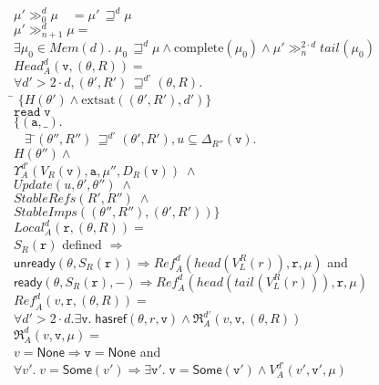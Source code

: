 \documentclass[preprint]{sigplanconf}
\newcommand{\betterstate}[3]{{#2}\, {\sqsupseteq}^{#1} {#3}}
\newcommand{\futurestate}[4]{{#3} \gg^{#1}_{#2} {#4}}
\newcommand{\ready}[3]{\mathsf{ready}({#1}, {#2}, {#3})}
\newcommand{\unready}[2]{\mathsf{unready}({#1}, {#2})}
\newcommand{\hasref}[3]{\mathsf{hasref}({#1}, {#2}, {#3})}
\renewcommand{\implies}{\Rightarrow}
\newcommand{\term}[1]{\ensuremath{\mathtt{{#1}}}}
\newcommand{\Head}{\mathit{Head}}
\newcommand{\Local}{\mathit{Local}}
\newcommand{\Ref}{\mathit{Ref}}
\newcommand{\Mem}[1]{\mathit{Mem}(#1)}
\newcommand{\Update}{\mathit{Update}}
\newcommand{\StableRef}{\mathit{StableRefs}}
\newcommand{\StableImp}{\mathit{StableImps}}
\newcommand{\None}{\mathsf{None}}
\newcommand{\Some}[1]{\mathsf{Some}({#1})}
\newcommand{\head}[1]{\mathit{head}(#1)}
\newcommand{\tail}[2][]{\mathit{tail}^{#1}(#2)}
\newcommand{\satisfyext}[2]{\mathrm{extsat}({#1}, {#2})}
\newcommand{\complete}[1]{\mathrm{complete}(#1)}
\begin{document}
\begin{figure}
\begin{tabbing}
$\futurestate{d}{0}{\mu'}{\mu} \;\;\;\,= \betterstate{d}{\mu'}{\mu}$ \\
$\futurestate{d}{n+1}{\mu'}{\mu} = $ \\
\> $\exists \mu_0 \in \Mem{d}.\; \betterstate{d}{\mu_0}{\mu} \land \complete{\mu_0} \land \futurestate{2\cdot d}{n}{\mu'}{\tail{\mu_0}}$ 
\\[1em]

$\Head^d_A(\term{v}, (\theta,R)) = $\\
\> $\forall d' > 2\cdot d, \betterstate{d'}{(\theta',R')}{(\theta,R)}.\;$ \\
\> \;\;\= $\{H(\theta') \land \satisfyext{(\theta',R')}{d'}\} $\\
\> \> \term{read\;v} \\
\> \> $\{(\term{a},\_).\;$\\ 
\> \> $\;\;\;\exists$ \=$\betterstate{d'}{(\theta'', R'')}{(\theta',R')}, u \subseteq \Delta_{R''}(\term{v}).$\\
\> \> \> $H(\theta'') \land$ \\
\> \> \> $\Upsilon^{d'}_A(V_R(\term{v}), \term{a}, \mu'', D_{R}(\term{v})) \;\land$ \\
\> \> \> $\Update(u, \theta', \theta'') \;\land$ \\ 
\> \> \> $\StableRef(R', R'') \;\land$ \\
\> \> \> $\StableImp((\theta'',R''), (\theta',R'))\} $
\\[1em]

$\Local^d_A(\term{r}, (\theta, R)) = $ \\
\> $S_R(\term{r})$ defined $\implies$ \\
\> \> $\unready{\theta}{S_R(\term{r})} \implies \Ref^d_A(\head{V^R_L(r)}, \term{r}, \mu)$ and \\
\> \> $\ready{\theta}{S_R(\term{r})}{-} \implies \Ref^d_A(\head{\tail{V^R_L(r)}}, \term{r}, \mu)$ \\[1em]

$\Ref^d_A(v, \term{r}, (\theta,R)) = $ \\
\> $\forall d' > 2\cdot d. \exists \term{v}.\;\hasref{\theta}{r}{\term{v}} \land \Re^{d'}_A(v, \term{v}, (\theta,R))$ 
\\[1em]

$\Re^d_A(v, \term{v}, \mu) = $ \\
\> \> $v = \None \implies \term{v} = \None$ and \\
\> \> $\forall v'.\; v = \Some{v'} \implies \exists \term{v'}.\; \term{v} = \Some{\term{v'}} \land
       V^{d'}_A(v', \term{v'}, \mu)$  \\[1em]


\end{tabbing}
\end{figure}
\end{document}
